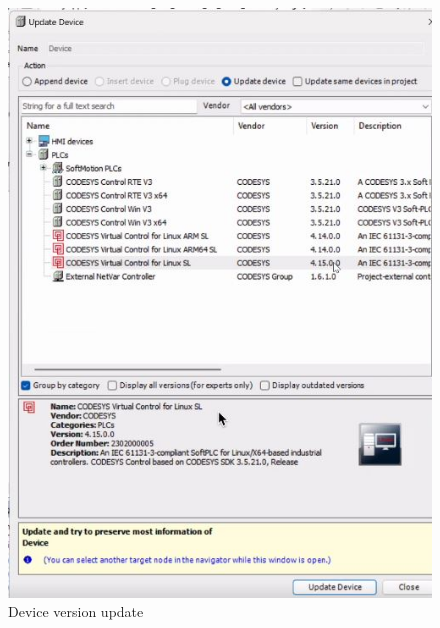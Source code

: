\documentclass[a4paper,12pt]{article}
\begin{document}
\begin{figure}[H]
	\centering
	\begin{minipage}{0.4\textwidth}
		\centering
		\includegraphics[width=\textwidth]{c4.jpg}
		\caption{Device version update}
	\end{minipage}
	\hspace{0.02\textwidth}
	\begin{minipage}{0.4\textwidth}
		\centering

\end{minipage}
\end{figure}
\end{document}
